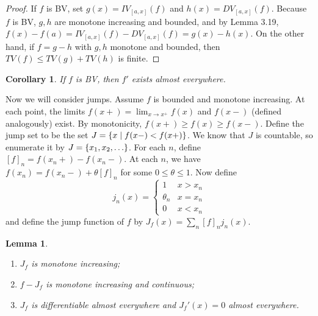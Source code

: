 \documentclass[leqno, openany]{memoir}
\newtheorem{cor}[thm]{Corollary}
\newtheorem{lem}[thm]{Lemma}
\theoremstyle{definition}
\theoremstyle{remark}
\theoremstyle{plain}
\theoremstyle{definition}
\theoremstyle{remark}
\begin{document}
\begin{proof} If $f$ is BV, set $g(x) = IV_{[a,x]}(f)$ and $h(x) =
    DV_{[a,x]}(f)$. Because $f$ is BV, $g,h$ are monotone increasing and
    bounded, and by Lemma 3.19, $f(x) - f(a) = IV_{[a,x]}(f) - DV_{[a,x]}(f) =
    g(x) - h(x)$. On the other hand, if $f = g-h$ with $g,h$ monotone and
    bounded, then $TV(f) \leq TV(g) + TV(h)$ is finite.  \end{proof}

\begin{cor} If $f$ is BV, then $f'$ exists almost everywhere.  \end{cor}

Now we will consider jumps. Assume $f$ is bounded and monotone increasing. At
each point, the limits $f(x+) = \lim_{x \to x^+} f(x)$ and $f(x-)$ (defined
analogously) exist. By monotonicity, $f(x+) \geq f(x) \geq f(x-)$. Define the
jump set to be the set $J = \qty{x \mid f(x-) < f(x+)}$. We know that $J$ is
countable, so enumerate it by $J = \qty{x_1, x_2, \ldots}$. For each $n$,
define $[f]_n = f(x_n+) - f(x_n-)$. At each $n$, we have $f(x_n) = f(x_n-) +
\theta[f]_n$ for some $0 \leq \theta \leq 1$. Now define \[ j_n(x) =
    \begin{cases} 1 & x > x_n \\ \theta_n & x = x_n \\ 0 & x < x_n \end{cases}
\] and define the jump function of $f$ by $J_f(x) = \sum_n [f]_n j_n(x)$.

\begin{lem} \begin{enumerate} \item $J_f$ is monotone increasing; \item $f -
J_f$ is monotone increasing and continuous; \item $J_f$ is differentiable
almost everywhere and $J_f'(x) = 0$ almost everywhere.  \end{enumerate}
\end{lem}
\end{document}
